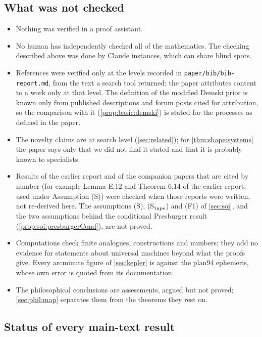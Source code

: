 \subsection{What was not checked}

\begin{itemize}[leftmargin=*]
\item Nothing was verified in a proof assistant.
\item No human has independently checked all of the mathematics. The checking described above was done by Claude instances, which can share blind spots.
\item References were verified only at the levels recorded in \texttt{paper/bib/bib-report.md}, from the text a search tool returned; the paper attributes content to a work only at that level. The definition of the modified Demski prior is known only from published descriptions and forum posts cited for attribution, so the comparison with it (\cref{prop:basic:demski}) is stated for the processes as defined in the paper.
\item The novelty claims are at search level (\cref{sec:related}); for \cref{thm:shape:systems} the paper says only that we did not find it stated and that it is probably known to specialists.
\item Results of the earlier report and of the companion papers that are cited by number (for example Lemma E.12 and Theorem 6.14 of the earlier report, used under Assumption (S)) were checked when those reports were written, not re-derived here. The assumptions (S), (S$_{\rm tape}$) and (F1) of \cref{sec:soi}, and the two assumptions behind the conditional Presburger result (\cref{prop:soi:presburgerCond}), are not proved.
\item Computations check finite analogues, constructions and numbers; they add no evidence for statements about universal machines beyond what the proofs give. Every arcminute figure of \cref{sec:kepler} is against the plan94 ephemeris, whose own error is quoted from its documentation.
\item The philosophical conclusions are assessments, argued but not proved; \cref{sec:phil:map} separates them from the theorems they rest on.
\end{itemize}

\subsection{Status of every main-text result}

